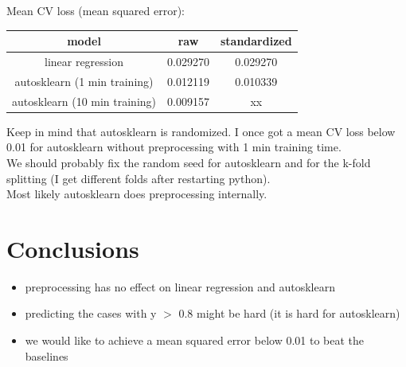 \documentclass[a4paper,10pt]{article}
\begin{document}
Mean CV loss (mean squared error):

\vspace{0.5cm}
\begin{tabular}{|c|c|c|}
 \hline
 model & raw & standardized \\
 \hline
 linear regression & 0.029270 & 0.029270 \\
 autosklearn (1 min training) & 0.012119 & 0.010339 \\
 autosklearn (10 min training) & 0.009157 & xx \\
 \hline
\end{tabular}

\vspace{0.5cm}
Keep in mind that autosklearn is randomized.
I once got a mean CV loss below 0.01 for autosklearn without preprocessing with 1 min training time.\\
We should probably fix the random seed for autosklearn and for the k-fold splitting (I get different folds after restarting python).\\
Most likely autosklearn does preprocessing internally.


\section{Conclusions}

\begin{itemize}
 \item preprocessing has no effect on linear regression and autosklearn
 \item predicting the cases with y $>$ 0.8 might be hard (it is hard for autosklearn)
 \item we would like to achieve a mean squared error below 0.01 to beat the baselines
\end{itemize}
\end{document}
